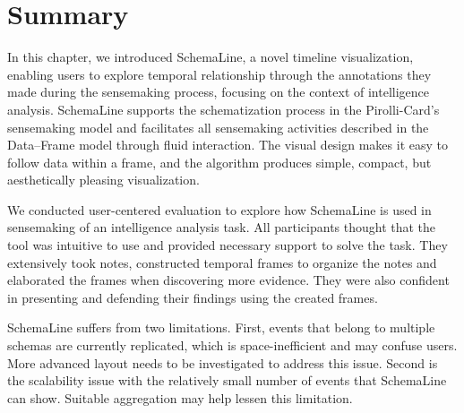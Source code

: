 \section{Summary}
In this chapter, we introduced SchemaLine, a novel timeline visualization, enabling users to explore temporal relationship through the annotations they made during the sensemaking process, focusing on the context of intelligence analysis. SchemaLine supports the schematization process in the Pirolli-Card's sensemaking model and facilitates all sensemaking activities described in the Data--Frame model through fluid interaction. The visual design makes it easy to follow data within a frame, and the algorithm produces simple, compact, but aesthetically pleasing visualization. 

We conducted user-centered evaluation to explore how SchemaLine is used in sensemaking of an intelligence analysis task. All participants thought that the tool was intuitive to use and provided necessary support to solve the task. They extensively took notes, constructed temporal frames to organize the notes and elaborated the frames when discovering more evidence. They were also confident in presenting and defending their findings using the created frames.

SchemaLine suffers from two limitations. First, events that belong to multiple schemas are currently replicated, which is space-inefficient and may confuse users. More advanced layout needs to be investigated to address this issue. Second is the scalability issue with the relatively small number of events that SchemaLine can show. Suitable aggregation may help lessen this limitation.